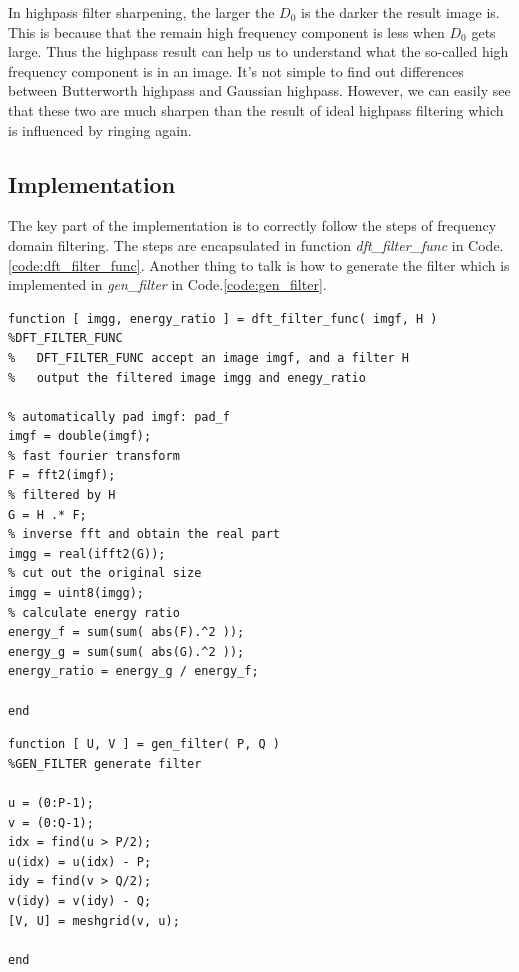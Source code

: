 In highpass filter sharpening, the larger the $D_0$ is the darker the result image is. This is because that the remain high frequency component is less when $D_0$ gets large. Thus the highpass result can help us to understand what the so-called high frequency component is in an image. It's not simple to find out differences between Butterworth highpass and Gaussian highpass. However, we can easily see that these two are much sharpen than the result of ideal highpass filtering which is influenced by ringing again.

\subsection{Implementation}
The key part of the implementation is to correctly follow the steps of frequency domain filtering. The steps are encapsulated in function \emph{dft\_filter\_func} in Code.\ref{code:dft_filter_func}. Another thing to talk is how to generate the filter which is implemented in \emph{gen\_filter} in Code.\ref{code:gen_filter}.

\clearpage
\lstset{language=Matlab}
\begin{lstlisting}
function [ imgg, energy_ratio ] = dft_filter_func( imgf, H )
%DFT_FILTER_FUNC 
%   DFT_FILTER_FUNC accept an image imgf, and a filter H
%   output the filtered image imgg and enegy_ratio

% automatically pad imgf: pad_f
imgf = double(imgf);
% fast fourier transform 
F = fft2(imgf);
% filtered by H
G = H .* F;
% inverse fft and obtain the real part
imgg = real(ifft2(G));
% cut out the original size
imgg = uint8(imgg);
% calculate energy ratio
energy_f = sum(sum( abs(F).^2 ));
energy_g = sum(sum( abs(G).^2 ));
energy_ratio = energy_g / energy_f;

end
\end{lstlisting}

\lstset{language=Matlab} 
\begin{lstlisting}
function [ U, V ] = gen_filter( P, Q )
%GEN_FILTER generate filter

u = (0:P-1);
v = (0:Q-1);
idx = find(u > P/2);
u(idx) = u(idx) - P;
idy = find(v > Q/2);
v(idy) = v(idy) - Q;
[V, U] = meshgrid(v, u);

end
\end{lstlisting}

